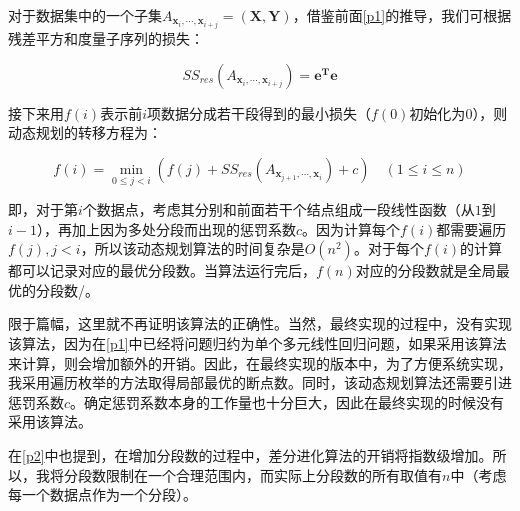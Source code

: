 对于数据集中的一个子集$A_{\mathbf{x}_i,\cdots,\mathbf{x}_{i+j}}=(\mathbf{X},\mathbf{Y})$，借鉴前面\ref{p1}的推导，我们可根据残差平方和度量子序列的损失：

\[SS_{res}(A_{\mathbf{x}_i,\cdots,\mathbf{x}_{i+j}})=\mathbf{e^T}\mathbf{e}\]

接下来用$f(i)$表示前$i$项数据分成若干段得到的最小损失（$f(0)$初始化为$0$），则动态规划的转移方程为：

\[f(i)=\min\limits _{0\leq j<i}(f(j)+SS_{res}(A_{\mathbf{x}_{j+1},\cdots,\mathbf{x}_{i}})+c)\quad (1 \leq i \leq n)\]

即，对于第$i$个数据点，考虑其分别和前面若干个结点组成一段线性函数（从$1$到$i-1$），再加上因为多处分段而出现的惩罚系数$c$。因为计算每个$f(i)$都需要遍历$f(j),j < i$，所以该动态规划算法的时间复杂是$O(n^2)$。对于每个$f(i)$的计算都可以记录对应的最优分段数。当算法运行完后，$f(n)$对应的分段数就是全局最优的分段数/。

限于篇幅，这里就不再证明该算法的正确性。当然，最终实现的过程中，没有实现该算法，因为在\ref{p1}中已经将问题归约为单个多元线性回归问题，如果采用该算法来计算，则会增加额外的开销。因此，在最终实现的版本中，为了方便系统实现，我采用遍历枚举的方法取得局部最优的断点数。同时，该动态规划算法还需要引进惩罚系数$c$。确定惩罚系数本身的工作量也十分巨大，因此在最终实现的时候没有采用该算法。

在\ref{p2}中也提到，在增加分段数的过程中，差分进化算法的开销将指数级增加。所以，我将分段数限制在一个合理范围内，而实际上分段数的所有取值有$n$中（考虑每一个数据点作为一个分段）。  


